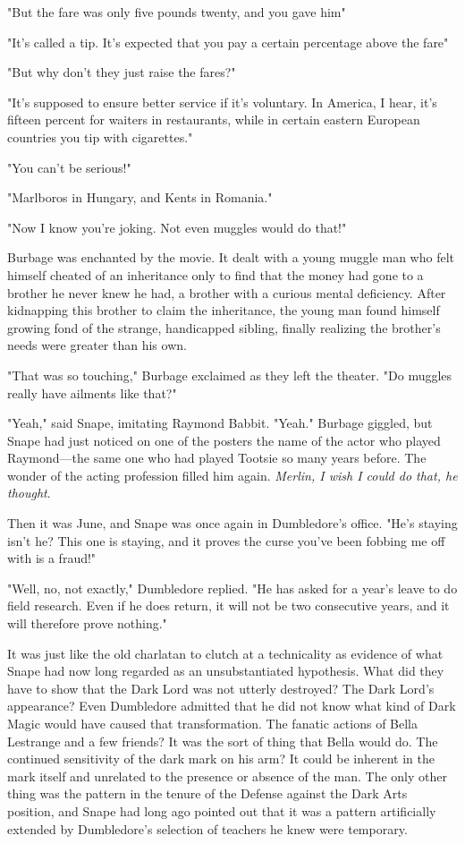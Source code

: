 "But the fare was only five pounds twenty, and you gave him{\el}"

"It's called a tip. It's expected that you pay a certain percentage above the fare{\el}"

"But why don't they just raise the fares?"

"It's supposed to ensure better service if it's voluntary. In America, I hear, it's fifteen percent for waiters in restaurants, while in certain eastern European countries you tip with cigarettes."

"You can't be serious!"

"Marlboros in Hungary, and Kents in Romania."

"Now I know you're joking. Not even muggles would do that!"

Burbage was enchanted by the movie. It dealt with a young muggle man who felt himself cheated of an inheritance only to find that the money had gone to a brother he never knew he had, a brother with a curious mental deficiency. After kidnapping this brother to claim the inheritance, the young man found himself growing fond of the strange, handicapped sibling, finally realizing the brother's needs were greater than his own.

"That was so touching," Burbage exclaimed as they left the theater. "Do muggles really have ailments like that?"

"Yeah," said Snape, imitating Raymond Babbit. "Yeah." Burbage giggled, but Snape had just noticed on one of the posters the name of the actor who played Raymond—the same one who had played Tootsie so many years before. The wonder of the acting profession filled him again. \emph{Merlin, I wish I could do that, he thought}.

Then it was June, and Snape was once again in Dumbledore's office. "He's staying isn't he? This one is staying, and it proves the curse you've been fobbing me off with is a fraud!"

"Well, no, not exactly," Dumbledore replied. "He has asked for a year's leave to do field research. Even if he does return, it will not be two consecutive years, and it will therefore prove nothing."

It was just like the old charlatan to clutch at a technicality as evidence of what Snape had now long regarded as an unsubstantiated hypothesis. What did they have to show that the Dark Lord was not utterly destroyed? The Dark Lord's appearance? Even Dumbledore admitted that he did not know what kind of Dark Magic would have caused that transformation. The fanatic actions of Bella Lestrange and a few friends? It was the sort of thing that Bella would do. The continued sensitivity of the dark mark on his arm? It could be inherent in the mark itself and unrelated to the presence or absence of the man. The only other thing was the pattern in the tenure of the Defense against the Dark Arts position, and Snape had long ago pointed out that it was a pattern artificially extended by Dumbledore's selection of teachers he knew were temporary.

